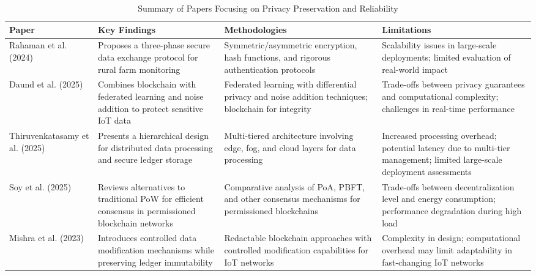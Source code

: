 \documentclass[12pt,onecolumn]{IEEEtran} %
\newcommand{\fitToPage}[1]{\begin{adjustbox}{max width=\textwidth}#1\end{adjustbox}}
\renewcommand{\arraystretch}{1.2} %
\begin{document}
\begin{table}[H]
\caption{Summary of Papers Focusing on Privacy Preservation and Reliability}
\label{tab:privacy}
\centering
\fitToPage{
\begingroup
\setlength{\tabcolsep}{4pt}
\renewcommand{\arraystretch}{1.15}
\footnotesize
\begin{tabularx}{\textwidth}{@{}P{0.18\textwidth}YYY@{}}
\toprule
\textbf{Paper} & \textbf{Key Findings} & \textbf{Methodologies} & \textbf{Limitations} \\
\midrule
Rahaman et al. (2024) & Proposes a three-phase secure data exchange protocol for rural farm monitoring & Symmetric/asymmetric encryption, hash functions, and rigorous authentication protocols & Scalability issues in large-scale deployments; limited evaluation of real-world impact \\
\addlinespace
Daund et al. (2025) & Combines blockchain with federated learning and noise addition to protect sensitive IoT data & Federated learning with differential privacy and noise addition techniques; blockchain for integrity & Trade-offs between privacy guarantees and computational complexity; challenges in real-time performance \\
\addlinespace
Thiruvenkatasamy et al. (2025) & Presents a hierarchical design for distributed data processing and secure ledger storage & Multi-tiered architecture involving edge, fog, and cloud layers for data processing & Increased processing overhead; potential latency due to multi-tier management; limited large-scale deployment assessments \\
\addlinespace
Soy et al. (2025) & Reviews alternatives to traditional PoW for efficient consensus in permissioned blockchain networks & Comparative analysis of PoA, PBFT, and other consensus mechanisms for permissioned blockchains & Trade-offs between decentralization level and energy consumption; performance degradation during high load \\
\addlinespace
Mishra et al. (2023) & Introduces controlled data modification mechanisms while preserving ledger immutability & Redactable blockchain approaches with controlled modification capabilities for IoT networks & Complexity in design; computational overhead may limit adaptability in fast-changing IoT networks \\
\bottomrule
\end{tabularx}
\endgroup
}
\end{table}
\end{document}
